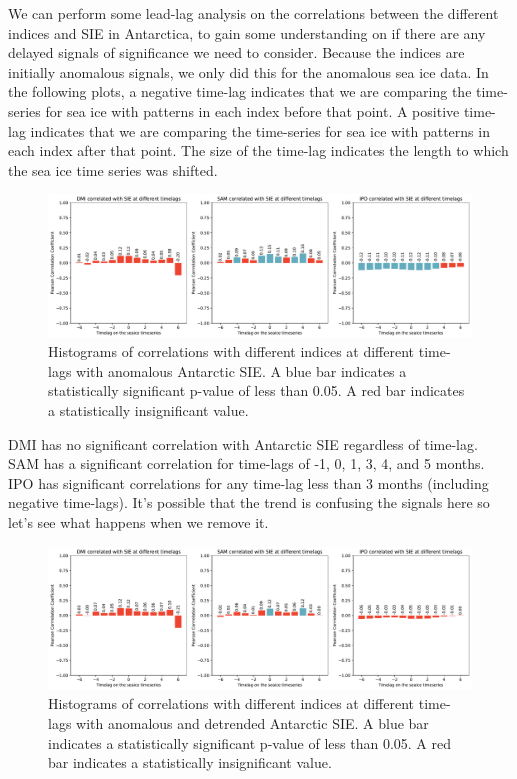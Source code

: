 We can perform some lead-lag analysis on the correlations between the different indices and SIE in Antarctica, to gain some understanding on if there are any delayed signals of significance we need to consider. Because the indices are initially anomalous signals, we only did this for the anomalous sea ice data. In the following plots, a negative time-lag indicates that we are comparing the time-series for sea ice with patterns in each index before that point. A positive time-lag indicates that we are comparing the time-series for sea ice with patterns in each index after that point. The size of the time-lag indicates the length to which the sea ice time series was shifted.
\begin{figure}[H]
    \centering
    \includegraphics[width = \linewidth]{Images_3.0/correlations/indicies_monthly_anomalous.pdf}
    \caption[Histograms of correlations with different indices at different time-lags with anomalous Antarctic SIE.]{Histograms of correlations with different indices at different time-lags with anomalous Antarctic SIE. A blue bar indicates a statistically significant p-value of less than 0.05. A red bar indicates a statistically insignificant value.}
    \label{fig:leadlag_anomalous}
\end{figure}

DMI has no significant correlation with Antarctic SIE regardless of time-lag. SAM has a significant correlation for time-lags of -1, 0, 1, 3, 4, and 5 months. IPO has significant correlations for any time-lag less than 3 months (including negative time-lags). It's possible that the trend is confusing the signals here so let's see what happens when we remove it.

\begin{figure}[H]
    \centering
    \includegraphics[width = \linewidth]{Images_3.0/correlations/indicies_monthly_anomalous_detrended.pdf}
    \caption[Histograms of correlations with different indices at different time-lags with anomalous and detrended Antarctic SIE.]{Histograms of correlations with different indices at different time-lags with anomalous and detrended Antarctic SIE. A blue bar indicates a statistically significant p-value of less than 0.05. A red bar indicates a statistically insignificant value.}
    \label{fig:leadlag_anomalous_detrended}
\end{figure}

